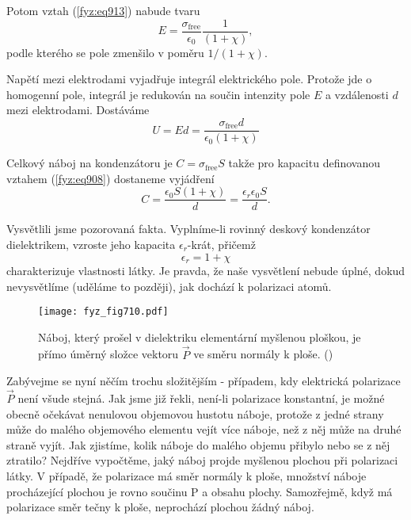    Potom vztah (\ref{fyz:eq913}) nabude tvaru
    \begin{equation}\label{fyz:eq915}
      E=\dfrac{σ_{\text{free}}}{ϵ_0}\dfrac{1}{(1+χ)},
    \end{equation}
    podle kterého se pole zmenšilo v poměru \(1/(1+χ)\).

    Napětí mezi elektrodami vyjadřuje integrál elektrického pole. Protože jde o homogenní pole,
    integrál je redukován na součin intenzity pole \(E\) a vzdálenosti \(d\) mezi elektrodami.
    Dostáváme
    \begin{equation*}
      U = Ed = \dfrac{σ_{\text{free}}d}{ϵ_0(1+χ)}
    \end{equation*}

    Celkový náboj na kondenzátoru je \(C = σ_{\text{free}}S\) takže pro kapacitu definovanou vztahem
    (\ref{fyz:eq908}) dostaneme vyjádření
    \begin{equation}\label{fyz:eq916}
      C=\dfrac{ϵ_0S(1+χ)}{d} = \dfrac{ϵ_rϵ_0S}{d}.
    \end{equation}

    Vysvětlili jsme pozorovaná fakta. Vyplníme-li rovinný deskový kondenzátor dielektrikem, vzroste
    jeho kapacita \(ϵ_r\)-krát, přičemž
    \begin{equation}\label{fyz:eq917}
      ϵ_r = 1+χ
    \end{equation}
    charakterizuje vlastnosti látky. Je pravda, že naše vysvětlení nebude úplné, dokud nevysvětlíme
    (uděláme to později), jak dochází k polarizaci atomů.

    \begin{figure}[ht!] %
      \centering
      \texttt{[image: fyz\_fig710.pdf]}
      \caption{Náboj, který prošel v dielektriku elementární myšlenou ploškou, je přímo úměrný
               složce vektoru \(\vec{P}\) ve směru normály k ploše. (\cite[s.~179]{Feynman02})}
      \label{fyz:fig710}
    \end{figure}

    Zabývejme se nyní něčím trochu složitějším - případem, kdy elektrická polarizace \(\vec{P}\)
    není všude stejná. Jak jsme již řekli, není-li polarizace konstantní, je možné obecně očekávat
    nenulovou objemovou hustotu náboje, protože z jedné strany může do malého objemového elementu
    vejít více náboje, než z něj může na druhé straně vyjít. Jak zjistíme, kolik náboje do malého
    objemu přibylo nebo se z něj ztratilo? Nejdříve vypočtěme, jaký náboj projde myšlenou plochou
    při polarizaci látky. V případě, že polarizace má směr normály k ploše, množství náboje
    procházející plochou je rovno součinu P a obsahu plochy. Samozřejmě, když má polarizace směr
    tečny k ploše, neprochází plochou žádný náboj.


